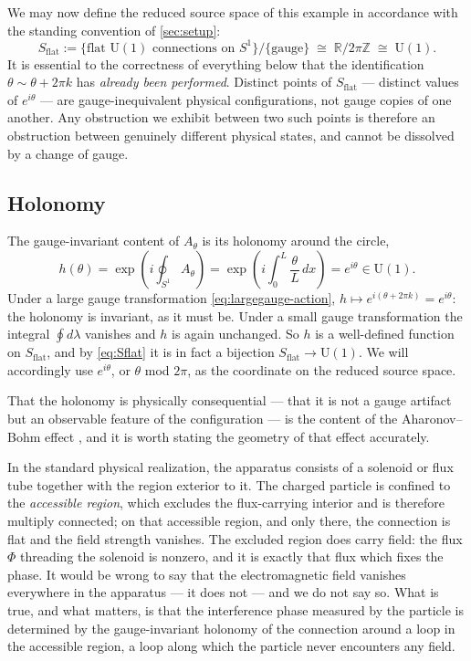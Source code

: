 \documentclass[11pt,reqno]{amsart}
\theoremstyle{plain}
\theoremstyle{definition}
\newcommand{\Rr}{\mathbb{R}}
\newcommand{\Zz}{\mathbb{Z}}
\newcommand{\Uone}{\mathrm{U}(1)}
\newcommand{\Src}{S}
\begin{document}
We may now define the reduced source space of this example in accordance with the standing
convention of \cref{sec:setup}:
\begin{equation}\label{eq:Sflat}
\Src_{\mathrm{flat}}:=\{\text{flat }\Uone\text{ connections on }S^1\}\big/\{\text{gauge}\}
\;\cong\;\Rr/2\pi\Zz\;\cong\;\Uone .
\end{equation}
It is essential to the correctness of everything below that the identification
$\theta\sim\theta+2\pi k$ has \emph{already been performed}. Distinct points of
$\Src_{\mathrm{flat}}$ --- distinct values of $e^{i\theta}$ --- are gauge-inequivalent physical
configurations, not gauge copies of one another. Any obstruction we exhibit between two such
points is therefore an obstruction between genuinely different physical states, and cannot be
dissolved by a change of gauge.

\subsection{Holonomy}

The gauge-invariant content of $A_\theta$ is its holonomy around the circle,
\begin{equation}\label{eq:holonomy}
h(\theta)=\exp\!\left(i\oint_{S^1}A_\theta\right)
=\exp\!\left(i\int_0^L\frac{\theta}{L}\,dx\right)
=e^{i\theta}\in\Uone .
\end{equation}
Under a large gauge transformation \eqref{eq:largegauge-action}, $h\mapsto e^{i(\theta+2\pi k)}
=e^{i\theta}$: the holonomy is invariant, as it must be. Under a small gauge transformation the
integral $\oint d\lambda$ vanishes and $h$ is again unchanged. So $h$ is a well-defined function
on $\Src_{\mathrm{flat}}$, and by \eqref{eq:Sflat} it is in fact a bijection
$\Src_{\mathrm{flat}}\to\Uone$. We will accordingly use $e^{i\theta}$, or $\theta$ mod $2\pi$,
as the coordinate on the reduced source space.

That the holonomy is physically consequential --- that it is not a gauge artifact but an
observable feature of the configuration --- is the content of the Aharonov--Bohm effect
\cite{AharonovBohm,WuYang}, and it is worth stating the geometry of that effect accurately.

In the standard physical realization, the apparatus consists of a solenoid or flux tube together
with the region exterior to it. The charged particle is confined to the \emph{accessible region},
which excludes the flux-carrying interior and is therefore multiply connected; on that accessible
region, and only there, the connection is flat and the field strength vanishes. The excluded
region does carry field: the flux $\Phi$ threading the solenoid is nonzero, and it is exactly that
flux which fixes the phase. It would be wrong to say that the electromagnetic field vanishes
everywhere in the apparatus --- it does not --- and we do not say so. What is true, and what
matters, is that the interference phase measured by the particle is determined by the
gauge-invariant holonomy of the connection around a loop in the accessible region, a loop along
which the particle never encounters any field.
\end{document}
